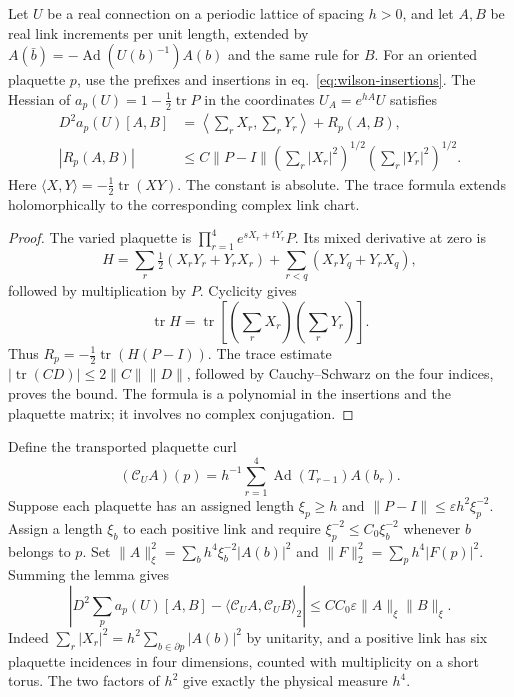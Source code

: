 \documentclass[11pt,letterpaper,reqno]{amsart}
\makeatletter
\numberwithin{equation}{section}
\renewcommand{\eqref}[1]{\textup{eq.~\ref{#1}}}
\theoremstyle{definition}
\newcommand{\ms@minorstart}{%
  \pushQED{\qed}\renewcommand{\qedsymbol}{$\blacksquare$}}
\newenvironment{lemma}[1][]{\ms@minorstart\ms@lemma[#1]}
  {\popQED\endms@lemma}
\theoremstyle{remark}
\makeatother
\begin{document}
\begin{lemma}[Plaquette Hessian]\label{lem:wilson-local-hessian}
Let \(U\) be a real connection on a periodic lattice of spacing
\(h>0\), and let \(A,B\) be real link increments per unit length,
extended by \(A(\bar b)=-\operatorname{Ad}(U(b)^{-1})A(b)\)
and the same rule for \(B\). For an oriented plaquette
\(p\), use the prefixes and insertions in \eqref{eq:wilson-insertions}.
The Hessian of \(a_p(U)=1-\tfrac12\operatorname{tr}P\) in the
coordinates \(U_A=e^{hA}U\) satisfies
\begin{equation}\label{eq:wilson-local-hessian}
 \begin{split}
 D^2a_p(U)[A,B]
 &=\left\langle\sum_rX_r,\sum_rY_r\right\rangle+R_p(A,B),\\
 |R_p(A,B)|&\le C\|P-I\|
       \left(\sum_r|X_r|^2\right)^{1/2}
       \left(\sum_r|Y_r|^2\right)^{1/2}.
 \end{split}
\end{equation}
Here $\langle X,Y\rangle=-\tfrac12\operatorname{tr}(XY)$.
The constant is absolute. The trace formula extends holomorphically
to the corresponding complex link chart.
\end{lemma}

\begin{proof}
The varied plaquette is
$\prod_{r=1}^4e^{sX_r+tY_r}P$. Its mixed derivative at zero is
\[
 H=\sum_r\tfrac12(X_rY_r+Y_rX_r)
       +\sum_{r<q}(X_rY_q+Y_rX_q),
\]
followed by multiplication by $P$. Cyclicity gives
\[
 \operatorname{tr}H=\operatorname{tr}
                 \left[\left(\sum_rX_r\right)\left(\sum_rY_r\right)\right].
\]
Thus $R_p=-\tfrac12\operatorname{tr}(H(P-I))$.
The trace estimate
$|\operatorname{tr}(CD)|\le2\|C\|\|D\|$, followed by
Cauchy--Schwarz on the four indices, proves the bound. The
formula is a polynomial in the insertions and the plaquette matrix;
it involves no complex conjugation.
\end{proof}

Define the transported plaquette curl
\[
 (\mathcal C_UA)(p)=h^{-1}\sum_{r=1}^4
                  \operatorname{Ad}(T_{r-1})A(b_r).
\]
Suppose each plaquette has an assigned length $\xi_p\ge h$ and
$\|P-I\|\le\varepsilon h^2\xi_p^{-2}$. Assign a length $\xi_b$
to each positive link and require $\xi_p^{-2}\le C_0\xi_b^{-2}$
whenever $b$ belongs to $p$. Set
$\|A\|_\xi^2=\sum_bh^4\xi_b^{-2}|A(b)|^2$ and
$\|F\|_2^2=\sum_ph^4|F(p)|^2$. Summing the lemma gives
\begin{equation}\label{eq:wilson-summed-hessian}
 \left|D^2\sum_pa_p(U)[A,B]
       -\langle\mathcal C_UA,\mathcal C_UB\rangle_2\right|
       \le C C_0\varepsilon\|A\|_\xi\|B\|_\xi .
\end{equation}
Indeed $\sum_r|X_r|^2=h^2\sum_{b\in\partial p}|A(b)|^2$ by
unitarity, and a positive link has six plaquette incidences in four
dimensions, counted with multiplicity on a short torus. The two
factors of $h^2$ give exactly the physical measure $h^4$.
\end{document}
